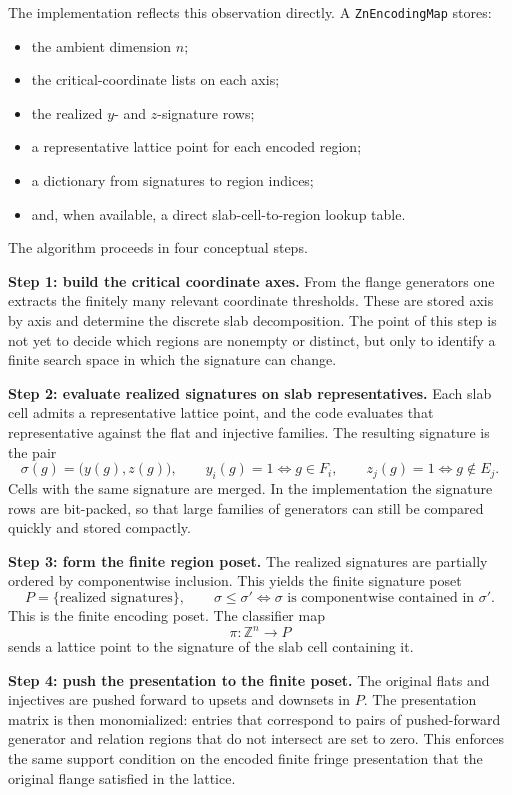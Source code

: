 \documentclass[11pt]{article}
\newcommand{\Z}{\mathbb{Z}}
\theoremstyle{definition}
\theoremstyle{remark}
\begin{document}
The implementation reflects this observation directly.  A \texttt{ZnEncodingMap} stores:
\begin{itemize}[leftmargin=1.5em]
	\item the ambient dimension $n$;
	\item the critical-coordinate lists on each axis;
	\item the realized $y$- and $z$-signature rows;
	\item a representative lattice point for each encoded region;
	\item a dictionary from signatures to region indices;
	\item and, when available, a direct slab-cell-to-region lookup table.
\end{itemize}

The algorithm proceeds in four conceptual steps.

\smallskip
\textbf{Step 1: build the critical coordinate axes.}
From the flange generators one extracts the finitely many relevant coordinate thresholds.  These are stored axis by axis and determine the discrete slab decomposition.  The point of this step is not yet to decide which regions are nonempty or distinct, but only to identify a finite search space in which the signature can change.

\smallskip
\textbf{Step 2: evaluate realized signatures on slab representatives.}
Each slab cell admits a representative lattice point, and the code evaluates that representative against the flat and injective families.  The resulting signature is the pair
\[
\sigma(g)= \bigl(y(g),z(g) \bigr),
\qquad
y_i(g)=1 \iff g\in F_i,
\qquad
z_j(g)=1 \iff g \notin E_j.
\]
Cells with the same signature are merged.  In the implementation the signature rows are bit-packed, so that large families of generators can still be compared quickly and stored compactly.

\smallskip
\textbf{Step 3: form the finite region poset.}
The realized signatures are partially ordered by componentwise inclusion.  This yields the finite signature poset
\[
P= \{ \text{realized signatures}\},
\qquad
\sigma \leq \sigma' \iff \sigma \text{ is componentwise contained in } \sigma'.
\]
This is the finite encoding poset.  The classifier map
\[
\pi : \Z^n \to P
\]
sends a lattice point to the signature of the slab cell containing it.

\smallskip
\textbf{Step 4: push the presentation to the finite poset.}
The original flats and injectives are pushed forward to upsets and downsets in $P$.  The presentation matrix is then monomialized: entries that correspond to pairs of pushed-forward generator and relation regions that do not intersect are set to zero.  This enforces the same support condition on the encoded finite fringe presentation that the original flange satisfied in the lattice.
\end{document}
